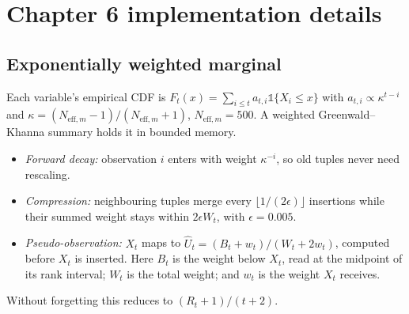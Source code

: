 \section{Chapter 6 implementation details}\label{app:ch6-design}

\subsection{Exponentially weighted marginal}
Each variable's empirical CDF is $F_t(x) = \sum_{i\le t} a_{t,i}\mathbb 1\{X_i \le x\}$ with $a_{t,i} \propto \kappa^{t-i}$ and $\kappa = (N_{\mathrm{eff},m}-1)/(N_{\mathrm{eff},m}+1)$, $N_{\mathrm{eff},m} = 500$.
A weighted Greenwald--Khanna summary holds it in bounded memory.
\begin{itemize}
  \item \emph{Forward decay:} observation $i$ enters with weight $\kappa^{-i}$, so old tuples never need rescaling.
  \item \emph{Compression:} neighbouring tuples merge every $\lfloor 1/(2\epsilon)\rfloor$ insertions while their summed weight stays within $2\epsilon W_t$, with $\epsilon = 0.005$.
  \item \emph{Pseudo-observation:} $X_t$ maps to $\widehat U_t = (B_t + w_t)/(W_t + 2w_t)$, computed before $X_t$ is inserted. Here $B_t$ is the weight below $X_t$, read at the midpoint of its rank interval; $W_t$ is the total weight; and $w_t$ is the weight $X_t$ receives.
\end{itemize}
Without forgetting this reduces to $(R_t+1)/(t+2)$.

